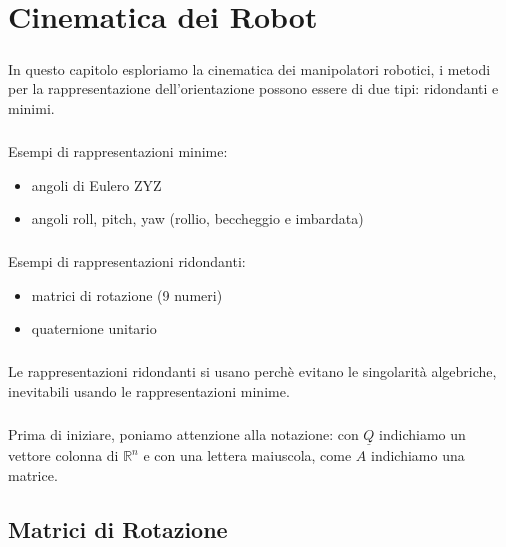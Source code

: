 \chapter{Cinematica dei Robot}

\paragraph{}
In questo capitolo esploriamo la cinematica dei manipolatori robotici, i metodi per la rappresentazione dell'orientazione possono essere di due tipi: ridondanti e minimi.

\paragraph{}
Esempi di rappresentazioni minime: 
\begin{itemize}
\item angoli di Eulero ZYZ
\item angoli roll, pitch, yaw (rollio, beccheggio e imbardata)
\end{itemize}

\paragraph{}
Esempi di rappresentazioni ridondanti:
\begin{itemize}
	\item matrici di rotazione (9 numeri)
	\item quaternione unitario
\end{itemize}

\paragraph{}
Le rappresentazioni ridondanti si usano perchè evitano le singolarità algebriche, inevitabili usando le rappresentazioni minime.

\paragraph{}
Prima di iniziare, poniamo attenzione alla notazione: con $\underline{Q}$ indichiamo un vettore colonna di $\mathbb{R}^{n}$ e con una lettera maiuscola, come $A$ indichiamo una matrice.

\section{Matrici di Rotazione}

